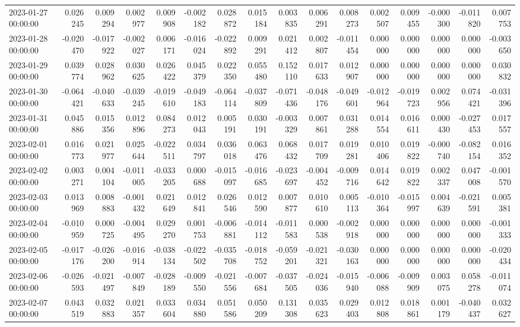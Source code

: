 \begin{tabular}{lrrrrrrrrrrrrrrr}
2023-01-27 00:00:00 & 0.026245 & 0.009294 & 0.002977 & 0.009908 & -0.002182 & 0.028872 & 0.015184 & 0.003835 & 0.006291 & 0.008273 & 0.002507 & 0.009455 & -0.000300 & -0.011820 & 0.007753 \\
2023-01-28 00:00:00 & -0.020470 & -0.017922 & -0.002027 & 0.006171 & -0.016024 & -0.022892 & 0.009291 & 0.021412 & 0.002807 & -0.011454 & 0.000000 & 0.000000 & 0.000000 & 0.000000 & -0.003650 \\
2023-01-29 00:00:00 & 0.039774 & 0.028962 & 0.030625 & 0.026422 & 0.045379 & 0.022350 & 0.055480 & 0.152110 & 0.017633 & 0.012907 & 0.000000 & 0.000000 & 0.000000 & 0.000000 & 0.030832 \\
2023-01-30 00:00:00 & -0.064421 & -0.040633 & -0.039245 & -0.019610 & -0.049183 & -0.064114 & -0.037809 & -0.071436 & -0.048176 & -0.049601 & -0.012964 & -0.019723 & 0.002956 & 0.074421 & -0.031396 \\
2023-01-31 00:00:00 & 0.045886 & 0.015356 & 0.012896 & 0.084273 & 0.012043 & 0.005191 & 0.030191 & -0.003329 & 0.007861 & 0.031288 & 0.014554 & 0.016611 & 0.000430 & -0.027453 & 0.017557 \\
2023-02-01 00:00:00 & 0.016773 & 0.021977 & 0.025644 & -0.022511 & 0.034797 & 0.036018 & 0.063476 & 0.068432 & 0.017709 & 0.019281 & 0.010406 & 0.019822 & -0.000740 & -0.082154 & 0.016352 \\
2023-02-02 00:00:00 & 0.003271 & 0.004104 & -0.011005 & -0.033205 & 0.000688 & -0.015097 & -0.016685 & -0.023697 & -0.004452 & -0.009716 & 0.014642 & 0.019822 & 0.002337 & 0.047008 & -0.001570 \\
2023-02-03 00:00:00 & 0.013969 & 0.008883 & -0.001432 & 0.021649 & 0.012841 & 0.026546 & 0.012590 & 0.007877 & 0.010610 & 0.005113 & -0.010364 & -0.015997 & 0.004639 & -0.021591 & 0.005381 \\
2023-02-04 00:00:00 & -0.010959 & 0.000725 & -0.004495 & 0.029270 & 0.001753 & -0.006881 & -0.014112 & -0.011583 & 0.000538 & -0.002918 & 0.000000 & 0.000000 & 0.000000 & 0.000000 & -0.001333 \\
2023-02-05 00:00:00 & -0.017176 & -0.026200 & -0.016914 & -0.038134 & -0.022502 & -0.035708 & -0.018752 & -0.059201 & -0.021321 & -0.030163 & 0.000000 & 0.000000 & 0.000000 & 0.000000 & -0.020434 \\
2023-02-06 00:00:00 & -0.026593 & -0.021497 & -0.007849 & -0.028189 & -0.009550 & -0.021556 & -0.007684 & -0.037505 & -0.024036 & -0.015940 & -0.006088 & -0.009909 & 0.003075 & 0.058278 & -0.011074 \\
2023-02-07 00:00:00 & 0.043519 & 0.032883 & 0.021357 & 0.033604 & 0.034880 & 0.051586 & 0.050209 & 0.131308 & 0.035623 & 0.029403 & 0.012808 & 0.018861 & 0.001179 & -0.040437 & 0.032627 \\

\end{tabular}
